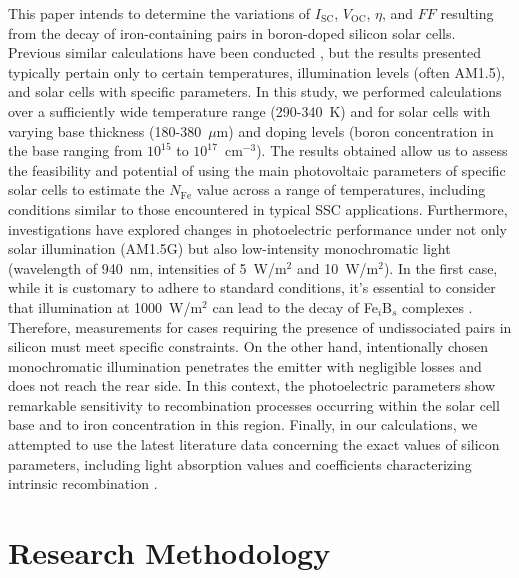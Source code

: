 \documentclass[a4paper,fleqn]{cas-sc}
\begin{document}
This paper intends to determine the variations of $I_\mathrm{SC}$, $V_\mathrm{OC}$, $\eta$, and $FF$
resulting from the decay of iron-containing pairs in boron-doped silicon solar cells.
Previous similar calculations have been conducted \cite{FeB:Schmidt,IronSC,Hajjiah2020},
but the results presented typically pertain only to certain temperatures,
illumination levels (often AM1.5), and solar cells with specific parameters.
In this study, we performed calculations over a sufficiently wide temperature range (290-340~K)
and for solar cells with varying base thickness (180-380~$\mu$m) and doping levels
(boron concentration in the base ranging from $10^{15}$ to $10^{17}$~cm$^{-3}$).
The results obtained allow us to assess the feasibility and potential of using the
main photovoltaic parameters of specific solar cells to estimate the $N_\mathrm{Fe}$ value across a range of temperatures,
including conditions similar to those encountered in typical SSC applications.
Furthermore, investigations have explored changes in photoelectric performance under not only solar illumination (AM1.5G)
but also low-intensity monochromatic light (wavelength of 940~nm, intensities of 5~W/m$^{2}$ and 10~W/m$^{2}$).
In the first case, while it is customary to adhere to standard conditions,
it's essential to consider that illumination at 1000~W/m$^{2}$ can lead to the decay of Fe$_i$B$_s$ complexes \cite{Macdonald2004}.
Therefore, measurements for cases requiring the presence of undissociated pairs in silicon must meet specific constraints.
On the other hand, intentionally chosen monochromatic illumination penetrates the emitter with negligible losses and does not reach the rear side.
In this context, the photoelectric parameters show remarkable sensitivity
to recombination processes occurring within the solar cell base and to iron concentration in this region.
Finally, in our calculations, we attempted to use the latest literature data
concerning the exact values of silicon parameters, including light absorption values \cite{Green2022}
and coefficients characterizing intrinsic recombination \cite{Brad2022,AugerSi2022}.

\section{Research Methodology}%
\end{document}
